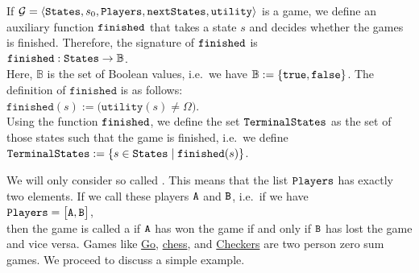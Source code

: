 \noindent
If $\mathcal{G} = \langle \texttt{States}, s_0, \texttt{Players}, \texttt{nextStates}, \texttt{utility}\rangle$
is a game, we define an auxiliary function $\texttt{finished}$ that takes a state $s$ and decides whether the games is finished.
Therefore, the signature of $\texttt{finished}$ is
\\[-0.2cm]
\hspace*{1.3cm}
$\texttt{finished}: \texttt{States} \rightarrow \mathbb{B}$.
\\[0.2cm]
Here, $\mathbb{B}$ is the set of Boolean values, i.e.~we have $\mathbb{B} := \{ \texttt{true}, \texttt{false} \}$.
The definition of $\texttt{finished}$ is as follows:
\\[0.2cm]
\hspace*{1.3cm}
$\texttt{finished}(s) := \bigl(\mathtt{utility}(s) \not= \Omega\bigr)$.
\\[0.2cm]
Using the function $\texttt{finished}$, we define the set $\texttt{TerminalStates}$ as the set of those
states such that the game is finished,  i.e.~we define 
\\[0.2cm]
\hspace*{1.3cm}
$\texttt{TerminalStates} := \{ s \in \texttt{States} \mid \texttt{finished}(s) \}$.
\vspace*{0.2cm}

We will only consider so called .  
This means that the list $\texttt{Players}$ has exactly two elements.  If we call these players $\texttt{A}$ and $\texttt{B}$, i.e.~if we have
\\[0.2cm]
\hspace*{1.3cm}
$\texttt{Players} = \bigl[ \texttt{A}, \texttt{B} \bigr]$,
\\[0.2cm]
then the game is called a   if $\texttt{A}$ has won the game if
and only if $\texttt{B}$ has lost the game and vice versa.
Games like \href{https://en.wikipedia.org/wiki/Go_(game)}{Go}, 
\href{https://en.wikipedia.org/wiki/Chess}{chess}, and
\href{https://en.wikipedia.org/wiki/Checkers}{Checkers} are two person zero sum games.
We proceed to discuss a simple example.

